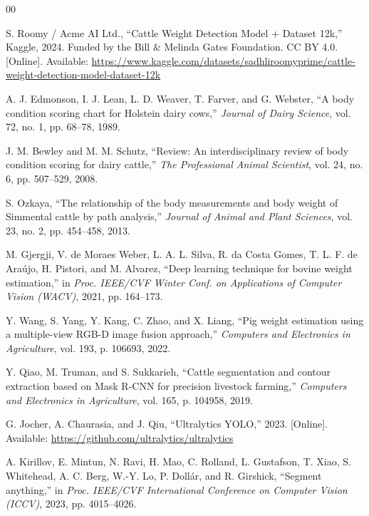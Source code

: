 \documentclass[conference]{IEEEtran}
\begin{document}

\begin{thebibliography}{00}

S. Roomy / Acme AI Ltd.,
``Cattle Weight Detection Model + Dataset 12k,''
Kaggle, 2024. Funded by the Bill \& Melinda Gates Foundation. CC BY 4.0.
[Online]. Available: \url{https://www.kaggle.com/datasets/sadhliroomyprime/cattle-weight-detection-model-dataset-12k}

A. J. Edmonson, I. J. Lean, L. D. Weaver, T. Farver, and G. Webster,
``A body condition scoring chart for Holstein dairy cows,''
\textit{Journal of Dairy Science}, vol. 72, no. 1, pp. 68--78, 1989.

J. M. Bewley and M. M. Schutz,
``Review: An interdisciplinary review of body condition scoring for dairy cattle,''
\textit{The Professional Animal Scientist}, vol. 24, no. 6, pp. 507--529, 2008.

S. Ozkaya,
``The relationship of the body measurements and body weight of Simmental cattle by path analysis,''
\textit{Journal of Animal and Plant Sciences}, vol. 23, no. 2, pp. 454--458, 2013.

M. Gjergji, V. de Moraes Weber, L. A. L. Silva, R. da Costa Gomes,
T. L. F. de Ara\'{u}jo, H. Pistori, and M. Alvarez,
``Deep learning technique for bovine weight estimation,''
in \textit{Proc. IEEE/CVF Winter Conf. on Applications of Computer Vision (WACV)},
2021, pp. 164--173.

Y. Wang, S. Yang, Y. Kang, C. Zhao, and X. Liang,
``Pig weight estimation using a multiple-view RGB-D image fusion approach,''
\textit{Computers and Electronics in Agriculture}, vol. 193, p. 106693, 2022.

Y. Qiao, M. Truman, and S. Sukkarieh,
``Cattle segmentation and contour extraction based on Mask R-CNN for precision livestock farming,''
\textit{Computers and Electronics in Agriculture}, vol. 165, p. 104958, 2019.

G. Jocher, A. Chaurasia, and J. Qiu,
``Ultralytics YOLO,'' 2023. [Online]. Available: \url{https://github.com/ultralytics/ultralytics}

A. Kirillov, E. Mintun, N. Ravi, H. Mao, C. Rolland, L. Gustafson,
T. Xiao, S. Whitehead, A. C. Berg, W.-Y. Lo, P. Doll\'{a}r, and R. Girshick,
``Segment anything,''
in \textit{Proc. IEEE/CVF International Conference on Computer Vision (ICCV)},
2023, pp. 4015--4026.


\end{thebibliography}
\end{document}
